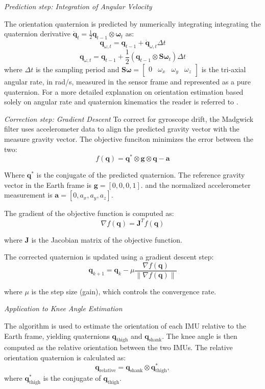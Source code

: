 \textit{Prediction step: Integration of Angular Velocity}

The orientation quaternion is predicted by numerically integrating integrating the quaternion derivative 
\(
\dot{\mathbf{q}}_t = \frac{1}{2} \mathbf{q}_{t-1} \otimes \boldsymbol{\omega}_t
\) as:
\[
\mathbf{q}_{\omega, t} = \mathbf{q}_{t-1} + \dot{\mathbf{q}}_{\omega, t} \Delta t
\]
\[
\mathbf{q}_{\omega, t} = \mathbf{q}_{t-1} + \frac{1}{2} \left( \mathbf{q}_{t-1} \otimes \mathbf{S}\boldsymbol{\omega}_t \right) \Delta t
\]
where \( \Delta t \) is the sampling period and 
\(
\mathbf{S}\boldsymbol{\omega} = 
\begin{bmatrix}
0 & \omega_x & \omega_y & \omega_z
\end{bmatrix}
\)
is the tri-axial angular rate, in rad/s, measured in the sensor frame and represented as a pure quaternion. For a more detailed explanation on orientation estimation based solely on angular rate and quaternion kinematics the reader is referred to \cite{sola_quaternion_2017}.

\textit{Correction step: Gradient Descent}
To correct for gyroscope drift, the Madgwick filter uses accelerometer data to align the predicted gravity vector with the measure gravity vector. The objective funciton minimizes the error between the two:
\[
f(\mathbf{q}) = \mathbf{q}^* \otimes \mathbf{g} \otimes \mathbf{q} - \mathbf{a}
\]

Where  \( \mathbf{q}^* \) is the conjugate of the predicted quaternion. The reference gravity vector in the Earth frame is \(\mathbf{g} = [0, 0, 0, 1].\) and the normalized accelerometer measurement is
    \(
    \mathbf{a} = [0, a_x, a_y, a_z].
    \)

The gradient of the objective function is computed as:
\[
\nabla f(\mathbf{q}) = \mathbf{J}^T f(\mathbf{q})
\]

where \( \mathbf{J} \) is the Jacobian matrix of the objective function.

The corrected quaternion is updated using a gradient descent step:
\[
\mathbf{q}_{k+1} = \mathbf{q}_k - \mu \frac{\nabla f(\mathbf{q})}{\|\nabla f(\mathbf{q})\|}
\]

where \( \mu \) is the step size (gain), which controls the convergence rate.


\textit{Application to Knee Angle Estimation}

 The algorithm is used to estimate the orientation of each IMU relative to the Earth frame, yielding quaternions \( \mathbf{q}_{\text{thigh}} \) and \( \mathbf{q}_{\text{shank}} \). The knee angle is then computed as the relative orientation between the two IMUs.
The relative orientation quaternion is calculated as:
\[
\mathbf{q}_{\text{relative}} = \mathbf{q}_{\text{shank}} \otimes \mathbf{q}_{\text{thigh}}^*,
\]
where \( \mathbf{q}_{\text{thigh}}^* \) is the conjugate of \( \mathbf{q}_{\text{thigh}} \).

